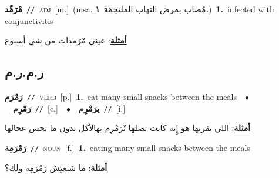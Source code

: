 \documentclass[10pt,a4paper,twoside]{article} %
\begin{document}
\begin{multicols}{2}
{\setlength\topsep{0pt}\textbf{\foreignlanguage{arabic}{مْرَمِّد}}\ {\color{gray}\texttt{//}\color{black}}\ \textsc{adj}\ [m.]\ \color{gray}(msa. \foreignlanguage{arabic}{مُصاب بمرض التهاب الملتحِمَة}~\foreignlanguage{arabic}{\textbf{١.}})\color{black}\ \textbf{1.}~infected with conjunctivitis\  \begin{flushright}\color{gray}\foreignlanguage{arabic}{\textbf{\underline{\foreignlanguage{arabic}{أمثلة}}}: عيني مْرَمدات من شي أسبوع}\end{flushright}\color{black}} \vspace{2mm}

\vspace{-3mm}
\subsection*{\color{blue}\foreignlanguage{arabic}{ر.م.ر.م}\color{blue}{}} 

{\setlength\topsep{0pt}\textbf{\foreignlanguage{arabic}{رَمْرَم}}\ {\color{gray}\texttt{//}\color{black}}\ \textsc{verb}\ [p.]\ \textbf{1.}~eat many small snacks between the meals\ \ $\bullet$\ \ \setlength\topsep{0pt}\textbf{\foreignlanguage{arabic}{رَمْرِم}}\ {\color{gray}\texttt{//}\color{black}}\ [c.]\ \ $\bullet$\ \ \setlength\topsep{0pt}\textbf{\foreignlanguage{arabic}{يرَمْرِم}}\ {\color{gray}\texttt{//}\color{black}}\ [i.]\  \begin{flushright}\color{gray}\foreignlanguage{arabic}{\textbf{\underline{\foreignlanguage{arabic}{أمثلة}}}: اللي بقرنها هو إِنه كانت تضلها تْرَمْرِم بهالأكل بدون ما تحس عحالها}\end{flushright}\color{black}} \vspace{2mm}

{\setlength\topsep{0pt}\textbf{\foreignlanguage{arabic}{رَمْرَمِة}}\ {\color{gray}\texttt{//}\color{black}}\ \textsc{noun}\ [f.]\ \textbf{1.}~eating many small snacks between the meals\  \begin{flushright}\color{gray}\foreignlanguage{arabic}{\textbf{\underline{\foreignlanguage{arabic}{أمثلة}}}: ما شبعتِش رَمْرَمِة ولك؟}\end{flushright}\color{black}} \vspace{2mm}


\end{multicols}
\end{document}
